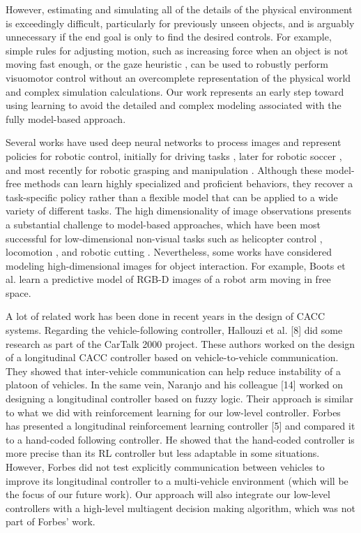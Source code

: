 However, estimating and simulating all of the details of the physical environment is exceedingly difficult, particularly for previously unseen objects, and is arguably unnecessary if the end goal is only to find the desired controls. For example, simple rules for adjusting motion, such as increasing force when an object is not moving fast enough, or the gaze heuristic \cite{FieldersNature2003}, can be used to robustly perform visuomotor control without an overcomplete representation of the physical world and complex simulation calculations. Our work represents an early step toward using learning to avoid the detailed and complex modeling associated with the fully model-based approach.

Several works have used deep neural networks to process images and represent policies for robotic control, initially for driving tasks \cite{AutonomousLand1989} \cite{LongrangeVision2009}, later for robotic soccer \cite{RobotSoccer2009}, and most recently for robotic grasping \cite{Grasp2016} \cite{RooticGrasping2016} and manipulation \cite{Visuomotor2016}. Although these model-free methods can learn highly specialized and proficient behaviors, they recover a task-specific policy rather than a flexible model that can be applied to a wide variety of different tasks. The high dimensionality of image observations presents a substantial challenge to model-based approaches, which have been most successful for low-dimensional non-visual tasks \cite{PolicySearch2011} such as helicopter control \cite{HeliNg2007}, locomotion \cite{Trajectory2012}, and robotic cutting \cite{Deepmpc2015}. Nevertheless, some works have considered modeling high-dimensional images for object interaction. For example, Boots et al. \cite{Predictive2014} learn a predictive model of RGB-D images of a robot arm moving in free space.


A lot of related work has been done in recent years in the design of CACC systems. Regarding the vehicle-following controller, Hallouzi et al. [8] did some research as part of the CarTalk 2000 project. These authors worked on the design of a longitudinal CACC controller based on vehicle-to-vehicle communication. They showed that inter-vehicle communication can help reduce instability of a platoon of vehicles. In the same vein, Naranjo and his colleague [14] worked on designing a longitudinal controller based on fuzzy logic. Their approach is similar to what we did with reinforcement learning for our low-level controller. Forbes has presented a longitudinal reinforcement learning controller [5] and compared it to a hand-coded following controller. He showed that the hand-coded controller is more precise than its RL controller but less adaptable in some situations. However, Forbes did not test explicitly communication between vehicles to improve its longitudinal controller to a multi-vehicle environment (which will be the focus of our future work). Our approach will also integrate our low-level controllers with a high-level multiagent decision making algorithm, which was not part of Forbes' work.

